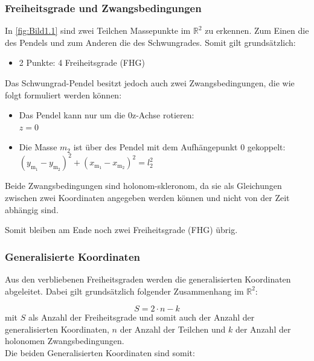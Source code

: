 \subsubsection{Freiheitsgrade und Zwangsbedingungen}

In \autoref{fig:Bild1.1} sind zwei Teilchen \bzw Massepunkte im $\mathbb{R}^2$ zu erkennen. Zum Einen die des Pendels und zum Anderen die des Schwungrades. Somit gilt grundsätzlich:

\begin{itemize}
    \item 2 Punkte: 4 Freiheitsgrade (FHG)
\end{itemize}

Das Schwungrad-Pendel besitzt jedoch auch zwei Zwangsbedingungen, die wie folgt formuliert werden können:

\begin{itemize}
    \item Das Pendel kann nur um die 0z-Achse rotieren: \\ $z = 0$
    \item Die Masse $m_2$ ist über des Pendel mit dem Aufhängepunkt 0 gekoppelt: \\ $(y_{\mathrm{m_1}} - y_{\mathrm{m_2}})^2 + (x_{\mathrm{m_1}} - x_{\mathrm{m_2}})^2 = l_2^2$
\end{itemize}

Beide Zwangsbedingungen sind holonom-skleronom, da sie als Gleichungen zwischen zwei Koordinaten angegeben werden können und nicht von der Zeit abhängig sind.

Somit bleiben am Ende noch zwei Freiheitsgrade (FHG) übrig.

\subsubsection{Generalisierte Koordinaten}

Aus den verbliebenen Freiheitsgraden werden die generalisierten Koordinaten abgeleitet. Dabei gilt grundsätzlich folgender Zusammenhang im $\mathbb{R}^2$:

\begin{equation} \label{eq:Gleichung2.6}
    \boxed{S = 2\cdot n - k}
\end{equation}
\newline
mit $S$ als Anzahl der Freiheitsgrade und somit auch der Anzahl der generalisierten Koordinaten, $n$ der Anzahl der Teilchen und $k$ der Anzahl der holonomen Zwangsbedingungen.\\
Die beiden Generalisierten Koordinaten sind somit:


